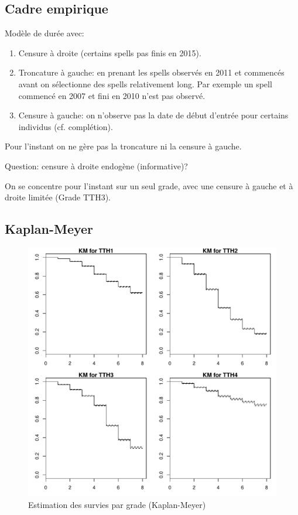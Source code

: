 \documentclass[11pt,a4paper]{article}
\begin{document}
\subsection*{Cadre empirique}

Modèle de durée avec: 
\begin{enumerate}[leftmargin=1cm ,parsep=0cm,itemsep=0cm,topsep=0cm] 
\item Censure à droite (certains spells pas finis en 2015). 
\item Troncature à gauche: en prenant les spells observés en 2011 et commencés avant on sélectionne des spells relativement long. Par exemple un spell commencé en 2007 et fini en 2010 n'est pas observé. 
\item Censure à gauche: on n'observe pas la date de début d'entrée pour certains individus (cf. complétion). 
\end{enumerate}

Pour l'instant on ne gère pas la troncature ni la censure à gauche. 

Question: censure à droite endogène (informative)? 


On se concentre pour l'instant sur un seul grade, avec une censure à gauche et à droite limitée (Grade TTH3). 




\subsection*{Kaplan-Meyer}

\begin{figure}[H] 
  \caption{Estimation des survies par grade (Kaplan-Meyer)}
  \label{censure} 
    \includegraphics[scale = 0.75]{KM.pdf} 
\end{figure}
\end{document}
